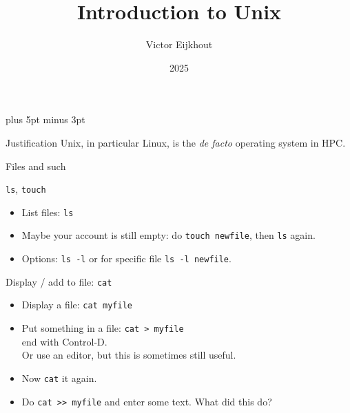 \documentclass[11pt,headernav]{beamer}
\begin{document}
\parskip=10pt plus 5pt minus 3pt

\title{Introduction to Unix}
\author{Victor Eijkhout}
\date{2025}

\begin{frame}
  \titlepage
\end{frame}


\begin{numberedframe}{Justification}
  Unix, in particular Linux, is the \textsl{de facto}
  operating system in \ac{HPC}.
\end{numberedframe}

 {Files and such}

\begin{numberedframe}{\texttt{ls}, \texttt{touch}}
  \label{sl-lnx:ls}
  \begin{itemize}
  \item List files: \lstinline{ls}
  \item Maybe your account is still empty: do \lstinline{touch newfile},
    then \lstinline{ls} again.
  \item Options: \lstinline{ls -l} or for specific file \lstinline{ls -l newfile}.
  \end{itemize}
\end{numberedframe}



\begin{numberedframe}{Display / add to file: \texttt{cat}}
  \label{sl-lnx:cat}
  \begin{itemize}
  \item Display a file: \lstinline{cat myfile}
  \item Put something in a file: \lstinline{cat > myfile}\\
    end with Control-D.\\
    Or use an editor, but this is sometimes still useful.
  \item Now \lstinline{cat} it again.
  \item Do \lstinline{cat >> myfile} and enter some text.
    What did this do?
  \end{itemize}
\end{numberedframe}
\end{document}
